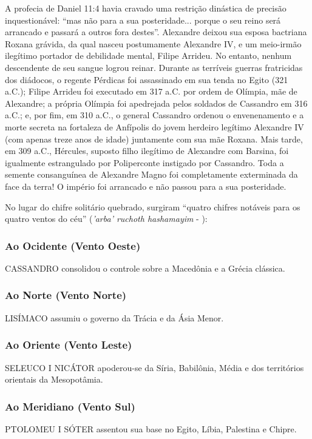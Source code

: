 A profecia de Daniel 11:4 havia cravado uma restrição dinástica de precisão inquestionável: ``mas não para a sua posteridade... porque o seu reino será arrancado e passará a outros fora destes''.
Alexandre deixou sua esposa bactriana Roxana grávida, da qual nasceu postumamente Alexandre IV, e um meio-irmão ilegítimo portador de debilidade mental, Filipe Arrideu. No entanto, nenhum descendente de seu sangue logrou reinar. Durante as terríveis guerras fratricidas dos diádocos, o regente Pérdicas foi assassinado em sua tenda no Egito (321 a.C.); Filipe Arrideu foi executado em 317 a.C. por ordem de Olímpia, mãe de Alexandre; a própria Olímpia foi apedrejada pelos soldados de Cassandro em 316 a.C.; e, por fim, em 310 a.C., o general Cassandro ordenou o envenenamento e a morte secreta na fortaleza de Anfípolis do jovem herdeiro legítimo Alexandre IV (com apenas treze anos de idade) juntamente com sua mãe Roxana. Mais tarde, em 309 a.C., Hércules, suposto filho ilegítimo de Alexandre com Barsina, foi igualmente estrangulado por Poliperconte instigado por Cassandro. Toda a semente consanguínea de Alexandre Magno foi completamente exterminada da face da terra! O império foi arrancado e não passou para a sua posteridade.

No lugar do chifre solitário quebrado, surgiram ``quatro chifres notáveis para os quatro ventos do céu'' (\textit{'arba' ruchoth hashamayim} - ):

\subsubsection*{Ao Ocidente (Vento Oeste)}
CASSANDRO consolidou o controle sobre a Macedônia e a Grécia clássica.

\subsubsection*{Ao Norte (Vento Norte)}
LISÍMACO assumiu o governo da Trácia e da Ásia Menor.

\subsubsection*{Ao Oriente (Vento Leste)}
SELEUCO I NICÁTOR apoderou-se da Síria, Babilônia, Média e dos territórios orientais da Mesopotâmia.

\subsubsection*{Ao Meridiano (Vento Sul)}
PTOLOMEU I SÓTER assentou sua base no Egito, Líbia, Palestina e Chipre.

